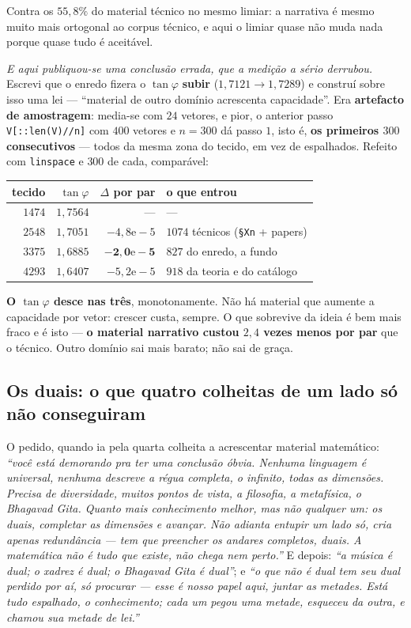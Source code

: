 \documentclass[11pt]{article}
\newcommand{\code}[1]{\texttt{\small #1}}
\theoremstyle{plain}
\theoremstyle{remark}
\begin{document}
\begin{itemize}
\noindent Contra os $55{,}8\%$ do material técnico no mesmo limiar: a narrativa é mesmo muito mais
ortogonal ao corpus técnico, e aqui o limiar quase não muda nada porque quase tudo é aceitável.

\emph{E aqui publiquou-se uma conclusão errada, que a medição a sério derrubou.} Escrevi que o
enredo fizera o $\tan\varphi$ \textbf{subir} ($1{,}7121 \to 1{,}7289$) e construí sobre isso uma
lei --- ``material de outro domínio acrescenta capacidade''. Era \textbf{artefacto de amostragem}:
media-se com $24$ vetores, e pior, o anterior passo \code{V[::len(V)//n]} com $400$ vetores e $n=300$ dá
passo $1$, isto é, \textbf{os primeiros $300$ consecutivos} --- todos da mesma zona do tecido, em
vez de espalhados. Refeito com \code{linspace} e $300$ de cada, comparável:

\begin{center}\small
\begin{tabular}{rrrl}
\hline
tecido & $\tan\varphi$ & $\Delta$ por par & o que entrou \\ \hline
$1474$ & $1{,}7564$ & --- & --- \\
$2548$ & $1{,}7051$ & $-4{,}8\mathrm{e}{-}5$ & $1074$ técnicos (\code{§Xn} + papers) \\
$3375$ & $1{,}6885$ & $\mathbf{-2{,}0\mathrm{e}{-}5}$ & $827$ do enredo, a fundo \\
$4293$ & $1{,}6407$ & $-5{,}2\mathrm{e}{-}5$ & $918$ da teoria e do catálogo \\
\hline
\end{tabular}
\end{center}

\noindent \textbf{O $\tan\varphi$ desce nas três}, monotonamente. Não há material que aumente a
capacidade por vetor: crescer custa, sempre. O que sobrevive da ideia é bem mais fraco e é isto ---
\textbf{o material narrativo custou $2{,}4$ vezes menos por par} que o técnico. Outro domínio sai
mais barato; não sai de graça.

\subsection*{Os duais: o que quatro colheitas de um lado só não conseguiram}

O pedido, quando ia pela quarta colheita a acrescentar material matemático: \emph{``você está
demorando pra ter uma conclusão óbvia. Nenhuma linguagem é universal, nenhuma descreve a régua
completa, o infinito, todas as dimensões. Precisa de diversidade, muitos pontos de vista, a
filosofia, a metafísica, o Bhagavad Gita. Quanto mais conhecimento melhor, mas não qualquer um: os
duais, completar as dimensões e avançar. Não adianta entupir um lado só, cria apenas redundância
--- tem que preencher os andares completos, duais. A matemática não é tudo que existe, não chega
nem perto.''} E depois: \emph{``a música é dual; o xadrez é dual; o Bhagavad Gita é dual''}; e
\emph{``o que não é dual tem seu dual perdido por aí, só procurar --- esse é nosso papel aqui,
juntar as metades. Está tudo espalhado, o conhecimento; cada um pegou uma metade, esqueceu da outra,
e chamou sua metade de lei.''}


\end{itemize}
\end{document}
